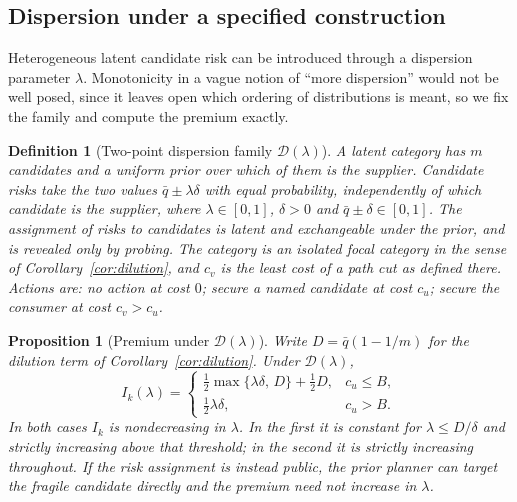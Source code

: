 \documentclass[pdflatex,sn-mathphys-num]{sn-jnl}
\theoremstyle{thmstyleone}
\newtheorem{proposition}[theorem]{Proposition}
\theoremstyle{thmstyletwo}
\theoremstyle{thmstylethree}
\newtheorem{definition}{Definition}
\begin{document}
\subsection{Dispersion under a specified construction}\label{sec:disp}

Heterogeneous latent candidate risk can be introduced through a dispersion
parameter $\lambda$. Monotonicity in a vague notion of ``more dispersion''
would not be well posed, since it leaves open which ordering of distributions
is meant, so we fix the family and compute the premium exactly.

\begin{definition}[Two-point dispersion family $\mathcal D(\lambda)$]
\label{def:disp}
A latent category has $m$ candidates and a uniform prior over which of them
is the supplier. Candidate risks take the two values $\bar q\pm\lambda\delta$
with equal probability, independently of which candidate is the supplier,
where $\lambda\in[0,1]$, $\delta>0$ and $\bar q\pm\delta\in[0,1]$. The
assignment of risks to candidates is latent and exchangeable under the
prior, and is revealed only by probing. The category is an isolated focal
category in the sense of Corollary~\ref{cor:dilution}, and $c_v$ is the
least cost of a path cut as defined there. Actions are: no action at cost $0$;
secure a named candidate at cost $c_u$; secure the consumer at cost
$c_v>c_u$.
\end{definition}

\begin{proposition}[Premium under $\mathcal D(\lambda)$]\label{prop:disp}
Write $D=\bar q(1-1/m)$ for the dilution term of
Corollary~\ref{cor:dilution}. Under $\mathcal D(\lambda)$,
\begin{equation}
I_k(\lambda)=
\begin{cases}
\tfrac12\max\{\lambda\delta,\,D\}+\tfrac12 D, & c_u\le B,\\[3pt]
\tfrac12\lambda\delta, & c_u>B .
\end{cases}
\label{eq:dispprem}
\end{equation}
In both cases $I_k$ is nondecreasing in $\lambda$. In the first it is
constant for $\lambda\le D/\delta$ and strictly increasing above that
threshold; in the second it is strictly increasing throughout. If the risk
assignment is instead public, the prior planner can target the fragile
candidate directly and the premium need not increase in $\lambda$.
\end{proposition}
\end{document}
